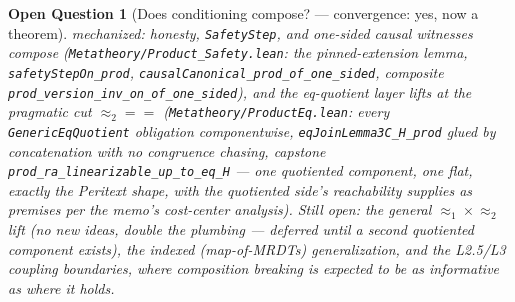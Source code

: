 \documentclass[11pt]{article}
\newtheorem{openq}[theorem]{Open Question}
\newcommand{\lean}[1]{\texttt{#1}}
\newcommand{\eqobs}{\approx}
\begin{document}
\begin{openq}[Does conditioning compose? --- convergence: yes, now a theorem]
mechanized: honesty, \lean{SafetyStep}, and \emph{one-sided} causal
witnesses compose (\lean{Metatheory/Product\_Safety.lean}: the
pinned-extension lemma, \lean{safetyStepOn\_prod},
\lean{causalCanonical\_prod\_of\_one\_sided}, composite
\lean{prod\_version\_inv\_on\_of\_one\_sided}), and the eq-quotient layer
lifts at the pragmatic cut $\eqobs_2 = {=}$
(\lean{Metatheory/ProductEq.lean}: every \lean{GenericEqQuotient}
obligation componentwise, \lean{eqJoinLemma3C\_H\_prod} glued by
concatenation with no congruence chasing, capstone
\lean{prod\_ra\_linearizable\_up\_to\_eq\_H} --- one quotiented component,
one flat, exactly the Peritext shape, with the quotiented side's
reachability supplies as premises per the memo's cost-center analysis).
Still open: the general $\eqobs_1 \times \eqobs_2$ lift (no new ideas,
double the plumbing --- deferred until a second quotiented component
exists), the indexed (map-of-MRDTs) generalization, and the L2.5/L3
coupling boundaries, where composition \emph{breaking} is expected to be
as informative as where it holds.
\end{openq}
\end{document}
